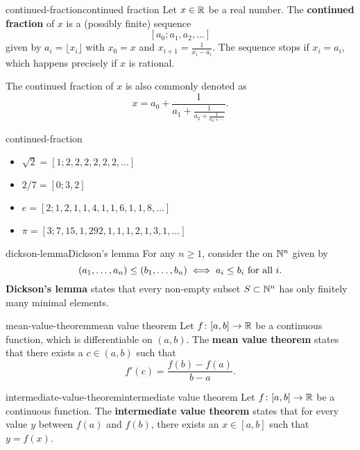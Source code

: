\begin{topic}{continued-fraction}{continued fraction}
    Let $x \in \mathbb{R}$ be a real number. The \textbf{continued fraction} of $x$ is a (possibly finite) sequence
    \[ [a_0; a_1, a_2, \ldots] \]
    given by $a_i = \lfloor x_i \rfloor$ with $x_0 = x$ and $x_{i + 1} = \frac{1}{x_i - a_i}$. The sequence stops if $x_i = a_i$, which happens precisely if $x$ is rational.
    
    The continued fraction of $x$ is also commonly denoted as
    \[ x = a_0 + \frac{1}{a_1 + \frac{1}{a_2 + \frac{1}{a_3 + \cdots }}} . \]
\end{topic}

\begin{example}{continued-fraction}
    \begin{itemize}
        \item $\sqrt{2} = [1; 2, 2, 2, 2, 2, 2, \ldots]$
        \item $2/7 = [0; 3, 2]$
        \item $e = [2; 1, 2, 1, 1, 4, 1, 1, 6, 1, 1, 8, \ldots]$
        \item $\pi = [3; 7, 15, 1, 292, 1, 1, 1, 2, 1, 3, 1, \ldots]$
    \end{itemize}
\end{example}

\begin{topic}{dickson-lemma}{Dickson's lemma}
    For any $n \ge 1$, consider the  on $\mathbb{N}^n$ given by
    \[ (a_1, \ldots, a_n) \le (b_1, \ldots, b_n) \iff a_i \le b_i \textup{ for all } i . \]
    \textbf{Dickson's lemma} states that every non-empty subset $S \subset \mathbb{N}^n$ has only finitely many minimal elements.
\end{topic}

\begin{topic}{mean-value-theorem}{mean value theorem}
    Let $f \colon [a, b] \to \mathbb{R}$ be a continuous function, which is differentiable on $(a, b)$. The \textbf{mean value theorem} states that there exists a $c \in (a, b)$ such that
    \[ f'(c) = \frac{f(b) - f(a)}{b - a} . \]
\end{topic}

\begin{topic}{intermediate-value-theorem}{intermediate value theorem}
    Let $f \colon [a, b] \to \mathbb{R}$ be a continuous function. The \textbf{intermediate value theorem} states that for every value $y$ between $f(a)$ and $f(b)$, there exists an $x \in [a, b]$ such that $y = f(x)$.
\end{topic}


